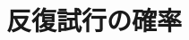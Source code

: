 \documentclass[../../../topic_probability-statistics]{subfiles}
\begin{document}
\sectionline
\section{反復試行の確率}

\todo{}
\end{document}
